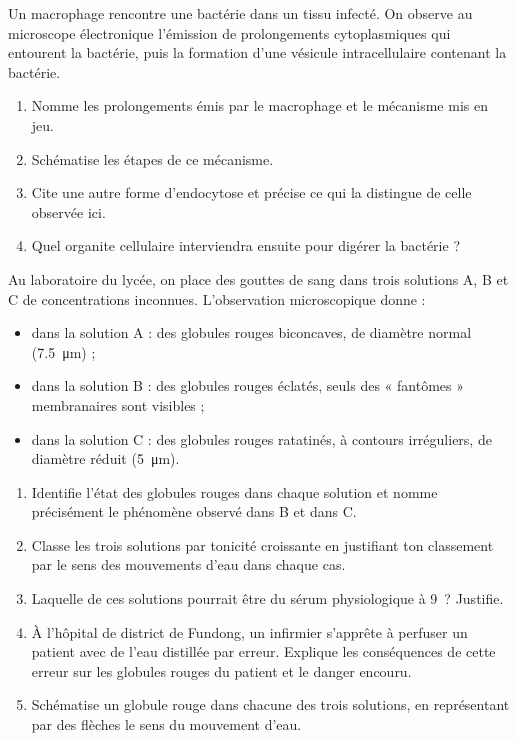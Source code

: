 \documentclass[11pt]{article}
\newcounter{popsec}
\newcounter{popsub}
\newcommand{\courssub}[1]{%
  \stepcounter{popsub}%
  \par\vspace{9pt}\noindent{\popxbold\fontsize{11.5}{13}\selectfont\color{popink}{\color{poporange}\thepopsec.\thepopsub}\hspace{6pt}#1}\par\nopagebreak\vspace{4pt}
}
\begin{document}
\begin{exercice}
Un macrophage rencontre une bactérie dans un tissu infecté. On observe au microscope électronique l'émission de prolongements cytoplasmiques qui entourent la bactérie, puis la formation d'une vésicule intracellulaire contenant la bactérie.
\begin{enumerate}
\item Nomme les prolongements émis par le macrophage et le mécanisme mis en jeu.
\item Schématise les étapes de ce mécanisme.
\item Cite une autre forme d'endocytose et précise ce qui la distingue de celle observée ici.
\item Quel organite cellulaire interviendra ensuite pour digérer la bactérie ?
\end{enumerate}
\end{exercice}

\courssub{Je me prépare au Bac}

\begin{exercice}
Au laboratoire du lycée, on place des gouttes de sang dans trois solutions A, B et C de concentrations inconnues. L'observation microscopique donne :
\begin{itemize}
\item dans la solution A : des globules rouges biconcaves, de diamètre normal (\SI{7,5}{\micro m}) ;
\item dans la solution B : des globules rouges éclatés, seuls des « fantômes » membranaires sont visibles ;
\item dans la solution C : des globules rouges ratatinés, à contours irréguliers, de diamètre réduit (\SI{5}{\micro m}).
\end{itemize}

\begin{enumerate}
\item Identifie l'état des globules rouges dans chaque solution et nomme précisément le phénomène observé dans B et dans C.
\item Classe les trois solutions par tonicité croissante en justifiant ton classement par le sens des mouvements d'eau dans chaque cas.
\item Laquelle de ces solutions pourrait être du sérum physiologique à 9~\textperthousand ? Justifie.
\item À l'hôpital de district de Fundong, un infirmier s'apprête à perfuser un patient avec de l'eau distillée par erreur. Explique les conséquences de cette erreur sur les globules rouges du patient et le danger encouru.
\item Schématise un globule rouge dans chacune des trois solutions, en représentant par des flèches le sens du mouvement d'eau.
\end{enumerate}
\end{exercice}
\end{document}
